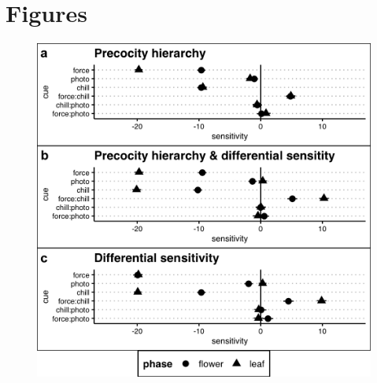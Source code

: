 \documentclass[11pt]{article}
\begin{document}
 


\section*{Figures}
\begin{figure}[h!]
    \centering
         \includegraphics[width=.8\textwidth]{..//Plots/Flobuds_manuscript_figs/simulations.png}

\end{figure}
\end{document}

